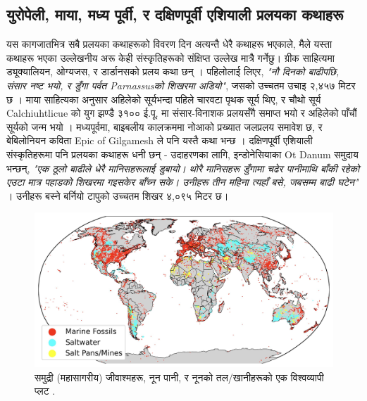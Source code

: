 \documentclass[10pt,twocolumn,letterpaper]{article}
\begin{document}
\subsection{युरोपेली, माया, मध्य पूर्वी, र दक्षिणपूर्वी एशियाली प्रलयका कथाहरू}

यस कागजातभित्र सबै प्रलयका कथाहरूको विवरण दिन अत्यन्तै धेरै कथाहरू भएकाले, मैले यस्ता कथाहरू भएका उल्लेखनीय अरू केही संस्कृतिहरूको संक्षिप्त उल्लेख मात्रै गर्नेछु। ग्रीक साहित्यमा ड्यूक्यालियन, ओग्यजस, र डार्डानसको प्रलय कथा छन् \cite{9,10}। पहिलोलाई लिएर, \textit{"नौ दिनको बाढीपछि, संसार नष्ट भयो, र डुँगा पर्वत Parnassusको शिखरमा अडियो"}, जसको उच्चतम उचाइ २,४५७ मिटर छ \cite{11}। माया साहित्यका अनुसार अहिलेको सूर्यभन्दा पहिले चारवटा पृथक सूर्य थिए, र चौथो सूर्य Calchiuhtlicue को युग झण्डै ३१०० ई.पू. मा संसार-विनाशक प्रलयसँगै समाप्त भयो र अहिलेको पाँचौं सूर्यको जन्म भयो \cite{12}। मध्यपूर्वमा, बाइबलीय कालक्रममा नोआको प्रख्यात जलप्रलय समावेश छ, र बेबिलोनियन कविता Epic of Gilgamesh ले पनि यस्तै कथा भन्छ \cite{13}। दक्षिणपूर्वी एशियाली संस्कृतिहरूमा पनि प्रलयका कथाहरू धनी छन् - उदाहरणका लागि, इन्डोनेसियाका Ot Danum समुदाय भन्छन्, \textit{"एक ठूलो बाढीले धेरै मानिसहरूलाई डुबायो। थोरै मानिसहरू डुँगामा चढेर पानीमाथि बाँकी रहेको एउटा मात्र पहाडको शिखरमा गइसकेर बाँच्न सके। उनीहरू तीन महिना त्यहाँ बसे, जबसम्म बाढी घटेन"} \cite{3}। उनीहरू बस्ने बर्नियो टापुको उच्चतम शिखर ४,०९५ मिटर छ।

\begin{figure}[b]
\begin{center}
\includegraphics[width=1\textwidth]{marine.jpg}

\end{center}
   \caption{समुद्री (महासागरीय) जीवाश्महरू, नून पानी, र नूनको तल/खानीहरूको एक विश्वव्यापी प्लट \cite{15,16,86,87}.}
   \label{fig:2}
\end{figure}
\end{document}
